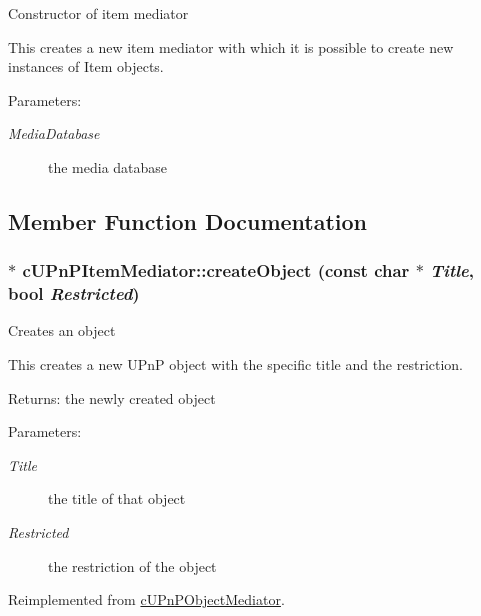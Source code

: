 Constructor of item mediator

This creates a new item mediator with which it is possible to create new instances of Item objects.

\begin{Desc}
\item[Parameters:]
\begin{description}
\item[{\em MediaDatabase}]the media database \end{description}
\end{Desc}


\subsection{Member Function Documentation}
\hypertarget{classcUPnPItemMediator_e2fd4cf5e6435f1eeadd11f9a99cd2db}{
\subsubsection[{createObject}]{ $\ast$ cUPnPItemMediator::createObject (const char $\ast$ {\em Title}, \/  bool {\em Restricted})}}
\label{classcUPnPItemMediator_e2fd4cf5e6435f1eeadd11f9a99cd2db}


Creates an object

This creates a new UPnP object with the specific title and the restriction.

\begin{Desc}
\item[Returns:]the newly created object \end{Desc}
\begin{Desc}
\item[Parameters:]
\begin{description}
\item[{\em Title}]the title of that object \item[{\em Restricted}]the restriction of the object \end{description}
\end{Desc}
  

Reimplemented from \hyperlink{classcUPnPObjectMediator_bfbca3f1cbadacee2b21306364750f26}{cUPnPObjectMediator}.

